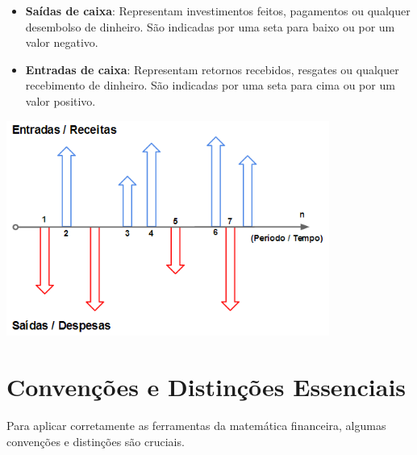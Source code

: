 \documentclass[
  a4paper,
]{book}
\begin{document}
\begin{tcolorbox}
\begin{itemize}
\item
  \textbf{Saídas de caixa}: Representam investimentos feitos, pagamentos
  ou qualquer desembolso de dinheiro. São indicadas por uma seta para
  baixo ou por um valor negativo.
\item
  \textbf{Entradas de caixa}: Representam retornos recebidos, resgates
  ou qualquer recebimento de dinheiro. São indicadas por uma seta para
  cima ou por um valor positivo.
\end{itemize}

\begin{center}
\includegraphics[width=4.16667in,height=\textheight,keepaspectratio]{resources/01-diagrama.png}
\end{center}

\section*{Convenções e Distinções
Essenciais}\label{convenuxe7uxf5es-e-distinuxe7uxf5es-essenciais}


Para aplicar corretamente as ferramentas da matemática financeira,
algumas convenções e distinções são cruciais.


\end{tcolorbox}
\end{document}
